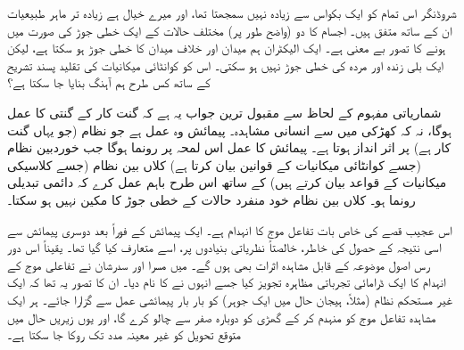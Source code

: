 شروڈنگر اس تمام کو ایک بکواس سے زیادہ نہیں سمجھتا تھا، اور میرے خیال ہے زیادہ تر ماہر طبیعیات ان کے ساتھ متفق ہیں۔  اجسام کا دو (واضح طور پر) مختلف حالات کے ایک خطی جوڑ کی صورت میں ہونے کا تصور بے معنی ہے۔ ایک الیکٹران ہم میدان اور خلاف میدان کا خطی جوڑ ہو سکتا ہے، لیکن ایک بلی زندہ اور مردہ کی خطی جوڑ نہیں ہو سکتی۔ اس کو کوانٹائی میکانیات کی تقلید پسند تشریح کے ساتھ کس طرح ہم آہنگ بنایا جا سکتا ہے؟

شماریاتی مفہوم کے لحاظ سے مقبول ترین جواب یہ ہے کہ گنت کار کے گنتی کا عمل  ہوگا، نہ کہ کھڑکی میں سے انسانی مشاہدہ۔ پیمائش وہ عمل ہے جو  نظام (جو یہاں گنت کار ہے) پر اثر انداز ہوتا ہے۔ پیمائش کا عمل اس لمحہ پر رونما ہوگا جب خوردبین نظام (جسے کوانٹائی میکانیات کے قوانین بیان کرتا ہے) کلاں بین نظام (جسے کلاسیکی میکانیات کے قواعد بیان کرتے ہیں) کے ساتھ اس طرح باہم عمل کرے کہ دائمی تبدیلی رونما ہو۔ کلاں بین نظام خود منفرد حالات کے خطی جوڑ کا مکین نہیں ہو سکتا۔

اس عجیب قصے کی خاص بات تفاعل موج کا انہدام ہے۔ ایک پیمائش کے فوراً بعد دوسری پیمائش سے اسی نتیجہ کے حصول کی خاطر، خالصتاً نظریاتی بنیادوں پر، اسے متعارف کیا گیا تھا۔ یقیناً اس دور رس اصول موضوعہ کے قابل مشاہدہ اثرات بھی ہوں گے۔  میں مسرا اور سدرشان نے تفاعلی موج کے انہدام کا ایک ڈرامائی تجرباتی مظاہرہ تجویز کیا جسے انہوں نے  کا نام دیا۔ ان کا تصور یہ تھا کہ ایک غیر مستحکم نظام (مثلاً، ہیجان حال میں ایک جوہر) کو بار بار پیمائشی عمل سے گزارا جائے۔ ہر ایک مشاہدہ تفاعل موج کو منہدم کر کے گھڑی کو دوبارہ صفر سے چالو کرے گا، اور یوں زیریں حال میں متوقع تحویل کو غیر معینہ مدد تک روکا جا سکتا ہے۔

